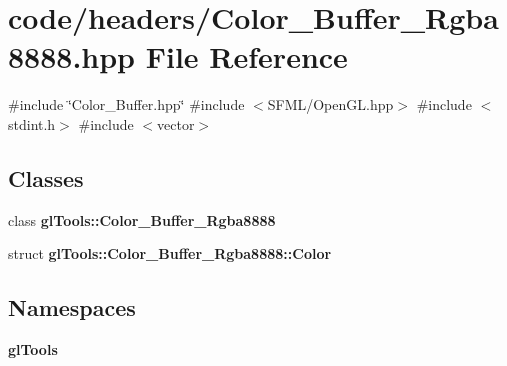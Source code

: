 \section{code/headers/\+Color\+\_\+\+Buffer\+\_\+\+Rgba8888.hpp File Reference}
\label{_color___buffer___rgba8888_8hpp}
{\ttfamily \#include \char`\"{}Color\+\_\+\+Buffer.\+hpp\char`\"{}}\newline
{\ttfamily \#include $<$S\+F\+M\+L/\+Open\+G\+L.\+hpp$>$}\newline
{\ttfamily \#include $<$stdint.\+h$>$}\newline
{\ttfamily \#include $<$vector$>$}\newline
\subsection*{Classes}
\begin{DoxyCompactItemize}
\item 
class \textbf{ gl\+Tools\+::\+Color\+\_\+\+Buffer\+\_\+\+Rgba8888}
\item 
struct \textbf{ gl\+Tools\+::\+Color\+\_\+\+Buffer\+\_\+\+Rgba8888\+::\+Color}
\end{DoxyCompactItemize}
\subsection*{Namespaces}
\begin{DoxyCompactItemize}
\item 
 \textbf{ gl\+Tools}
\end{DoxyCompactItemize}
